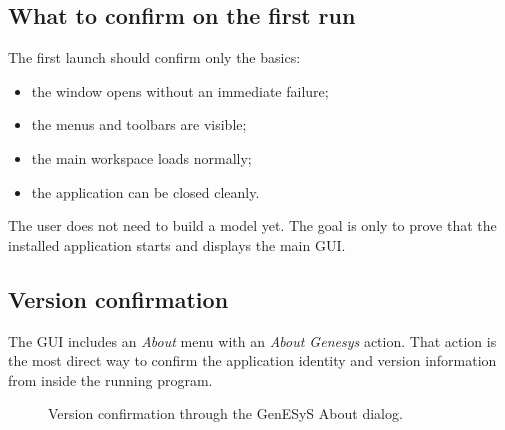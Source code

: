 \subsection{What to confirm on the first run}
\label{subsec:user-installation-first-run-checks}

The first launch should confirm only the basics:
\begin{itemize}
\item the window opens without an immediate failure;
\item the menus and toolbars are visible;
\item the main workspace loads normally;
\item the application can be closed cleanly.
\end{itemize}

The user does not need to build a model yet. The goal is only to prove that the
installed application starts and displays the main GUI.

\subsection{Version confirmation}
\label{subsec:user-installation-version-confirmation}

The GUI includes an \textit{About} menu with an \textit{About Genesys} action.
That action is the most direct way to confirm the application identity and
version information from inside the running program.

\begin{figure}[htbp]
    \centering



    \caption{Version confirmation through the GenESyS About dialog.}
    \label{fig:user-version-confirmation}
\end{figure}

